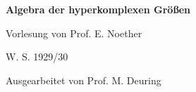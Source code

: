 {\LARGE\bfseries Algebra der hyperkomplexen Größen\par}
\vspace{3.5em}
{\large Vorlesung von Prof. E. Noether\par}
{\large W. S. 1929/30\par}
\vspace{1.5em}
{\large Ausgearbeitet von Prof. M. Deuring\par}
